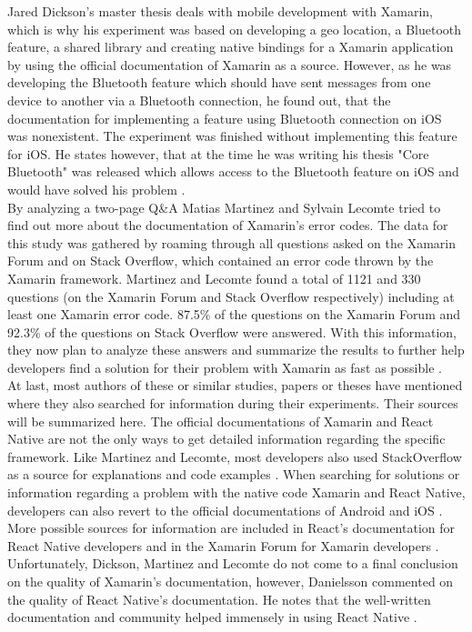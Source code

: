 \documentclass[Bachelor,BIF,english]{twbook}
\begin{document}
Jared Dickson’s master thesis deals with mobile development with Xamarin, which is why his experiment was based on developing a geo location, a Bluetooth feature, a shared library and creating native bindings for a Xamarin application by using the official documentation of Xamarin \cite{XamarinDoc} as a source. However, as he was developing the Bluetooth feature which should have sent messages from one device to another via a Bluetooth connection, he found out, that the documentation for implementing a feature using Bluetooth connection on iOS was nonexistent. The experiment was finished without implementing this feature for iOS. He states however, that at the time he was writing his thesis "Core Bluetooth" was released which allows access to the Bluetooth feature on iOS and would have solved his problem \cite[p.~11]{Dickson_2013}.
\\[\baselineskip]
By analyzing a two-page Q\&A Matias Martinez and Sylvain Lecomte tried to find out more about the documentation of Xamarin's error codes. The data for this study was gathered by roaming through all questions asked on the Xamarin Forum and on Stack Overflow, which contained an error code thrown by the Xamarin framework. Martinez and Lecomte found a total of 1121 and 330 questions (on the Xamarin Forum and Stack Overflow respectively) including at least one Xamarin error code. 87.5\% of the questions on the Xamarin Forum and 92.3\% of the questions on Stack Overflow were answered. With this information, they now plan to analyze these answers and summarize the results to further help developers find a solution for their problem with Xamarin as fast as possible \cite[p.~1,~4]{MartinezLecomte2018}.
\\[\baselineskip]
At last, most authors of these or similar studies, papers or theses have mentioned where they also searched for information during their experiments. Their sources will be summarized here. The official documentations of Xamarin and React Native are not the only ways to get detailed information regarding the specific framework. Like Martinez and Lecomte, most developers also used StackOverflow as a source for explanations and code examples \cite{MartinezLecomte2018}. When searching for solutions or information regarding a problem with the native code Xamarin and React Native, developers can also revert to the official documentations of Android and iOS \cite[p.~11]{Dickson_2013}. More possible sources for information are included in React’s documentation for React Native developers \cite{ReactDoc} and in the Xamarin Forum for Xamarin developers \cite[p.~51]{Danielsson_2016} \cite{MartinezLecomte2018}. Unfortunately, Dickson, Martinez and Lecomte do not come to a final conclusion on the quality of Xamarin's documentation, however, Danielsson commented on the quality of React Native's documentation. He notes that the well-written documentation and community helped immensely in using React Native \cite[p.~51]{Danielsson_2016}.
\end{document}
